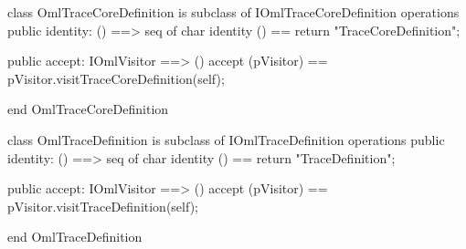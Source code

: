 \begin{vdm_al}
class OmlTraceCoreDefinition is subclass of IOmlTraceCoreDefinition
operations
  public identity: () ==> seq of char
  identity () == return "TraceCoreDefinition";

  public accept: IOmlVisitor ==> ()
  accept (pVisitor) == pVisitor.visitTraceCoreDefinition(self);

end OmlTraceCoreDefinition
\end{vdm_al}
\begin{vdm_al}
class OmlTraceDefinition is subclass of IOmlTraceDefinition
operations
  public identity: () ==> seq of char
  identity () == return "TraceDefinition";

  public accept: IOmlVisitor ==> ()
  accept (pVisitor) == pVisitor.visitTraceDefinition(self);

end OmlTraceDefinition
\end{vdm_al}
